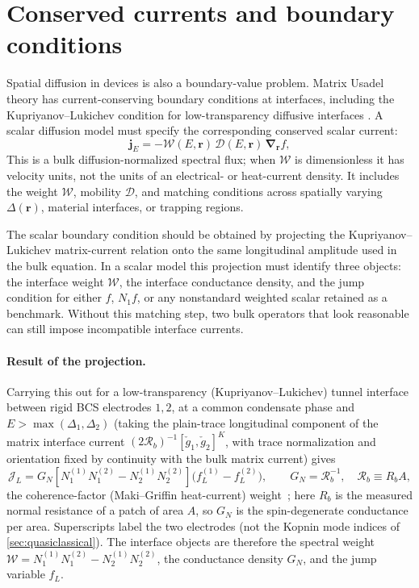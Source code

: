 \documentclass[
  aps,
  prb,
  preprint,
  superscriptaddress,
  longbibliography,
  nofootinbib
]{revtex4-2}
\newcommand{\br}{\mathbf{r}}
\newcommand{\bnabla}{\boldsymbol{\nabla}}
\newcommand{\DOS}{N_1}
\newcommand{\fL}{f_L}
\begin{document}
\section{Conserved currents and boundary conditions}
\label{sec:conserved_currents}

Spatial diffusion in devices is also a boundary-value problem. Matrix Usadel
theory has current-conserving boundary conditions at interfaces, including the
Kupriyanov--Lukichev condition for low-transparency diffusive interfaces
\cite{kupriyanov1988}. A scalar diffusion model must specify the corresponding
conserved scalar current:
\begin{equation}
  \mathbf{j}_E
  =
  -\mathcal{W}(E,\br)\,\mathcal{D}(E,\br)\,
  \bnabla_{\br}f,
  \label{eq:generic_energy_current}
\end{equation}
This is a bulk diffusion-normalized spectral flux; when
\(\mathcal W\) is dimensionless it has velocity units, not the units of an
electrical- or heat-current density. It includes the weight
\(\mathcal{W}\), mobility \(\mathcal{D}\), and matching
conditions across spatially varying \(\Delta(\br)\), material interfaces, or
trapping regions.

The scalar boundary condition should be obtained by projecting the
Kupriyanov--Lukichev matrix-current relation onto the same longitudinal
amplitude used in the bulk equation. In a scalar model this projection must
identify three objects: the interface weight \(\mathcal{W}\), the interface
conductance density, and the jump condition for either \(f\), \(\DOS f\), or any
nonstandard weighted scalar retained as a benchmark. Without this matching step,
two bulk operators that look reasonable can still impose incompatible interface
currents.

\paragraph{Result of the projection.} Carrying this out for a low-transparency
(Kupriyanov--Lukichev) tunnel interface between rigid BCS electrodes \(1,2\),
at a common condensate phase and \(E>\max(\Delta_1,\Delta_2)\) (taking
the plain-trace longitudinal component of the matrix interface current
\((2\mathcal R_b)^{-1}[\check{g}_1,\check{g}_2]^{K}\), with trace normalization
and orientation fixed by continuity with the bulk matrix current) gives
\begin{equation}
  \mathcal J_L=G_N\!\left[\DOS^{(1)}\DOS^{(2)}
  -N_2^{(1)}N_2^{(2)}\right]\!
  \bigl(\fL^{(1)}-\fL^{(2)}\bigr),
  \qquad
  G_N=\mathcal R_b^{-1},\quad \mathcal R_b\equiv R_bA,
  \label{eq:scalar_BC_energy}
\end{equation}
the coherence-factor (Maki--Griffin heat-current) weight~\cite{maki1965};
here \(R_b\) is the measured normal resistance of a patch of area \(A\), so
\(G_N\) is the spin-degenerate conductance per area. Superscripts label the
two electrodes (not the Kopnin mode indices of
\cref{sec:quasiclassical}). The interface
objects are therefore the spectral weight
\(\mathcal{W}=\DOS^{(1)}\DOS^{(2)}-N_2^{(1)}N_2^{(2)}\), the
conductance density \(G_N\), and the jump variable \(\fL\).
\end{document}
